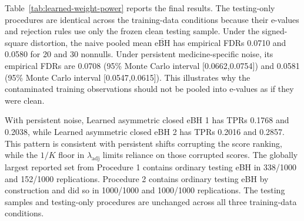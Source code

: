 Table~\ref{tab:learned-weight-power} reports the final results. The testing-only procedures are identical across the training-data conditions because their e-values and rejection rules use only the frozen clean testing sample. Under the signed-square distortion, the naive pooled mean $\overline{\mathrm{eBH}}$ has empirical FDRs 0.0710 and 0.0580 for 20 and 30 nonnulls. Under persistent medicine-specific noise, its empirical FDRs are 0.0708 (95\% Monte Carlo interval [0.0662,0.0754]) and 0.0581 (95\% Monte Carlo interval [0.0547,0.0615]). This illustrates why the contaminated training observations should not be pooled into e-values as if they were clean.

With persistent noise, Learned asymmetric closed eBH 1 has TPRs 0.1768 and 0.2038, while Learned asymmetric closed eBH 2 has TPRs 0.2016 and 0.2857. This pattern is consistent with persistent shifts corrupting the score ranking, while the $1/K$ floor in $\lambda_{\mathrm{adj}}$ limits reliance on those corrupted scores. The globally largest reported set from Procedure 1 contains ordinary testing eBH in 338/1000 and 152/1000 replications. Procedure 2 contains ordinary testing eBH by construction and did so in 1000/1000 and 1000/1000 replications. The testing samples and testing-only procedures are unchanged across all three training-data conditions.
